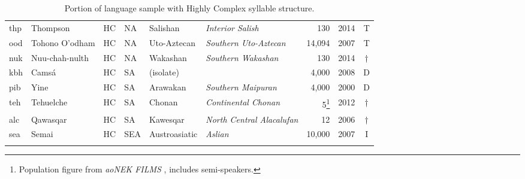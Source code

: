 \begin{table}
\begin{tabularx}{\textwidth}{lQllQQrlc}
 thp & {{Thompson}} & HC & NA & {Salishan} & {\textit{Interior Salish}} &  130 & 2014 & T\\
 ood & {{Tohono O’odham}} & HC & NA & {Uto-Aztecan} & {\textit{Southern Uto-Aztecan}} &  14,094 & 2007 & T\\
 nuk & {{Nuu-chah-nulth}} & HC & NA & {Wakashan} & {\textit{Southern Wakashan}} &  130 & 2014 & †\\
 kbh & {{Camsá}} & HC & SA & {(isolate)} &  &  4,000 & 2008 & D\\
 pib & {{Yine}} & HC & SA & {Arawakan} & {\textit{Southern Maipuran}} &  4,000 & 2000 & D\\
 teh & {{Tehuelche}} & HC & SA & {Chonan} & {\textit{Continental Chonan}} &  5\footnote{Population figure from \textit{aoNEK FILMS} , includes semi-speakers.} & 2012 & †\\
 alc & {{Qawasqar}} & HC & SA & {Kawesqar} & {\textit{North Central Alacalufan}} &  12 & 2006 & †\\
 sea & {{Semai}} & HC & SEA  & {Austroasiatic} & {\textit{Aslian}} &  10,000 & 2007 & I\\
\lspbottomrule
\end{tabularx}
\caption{Portion of language sample with Highly Complex syllable structure.\label{tab:A.4}}
\end{table}
